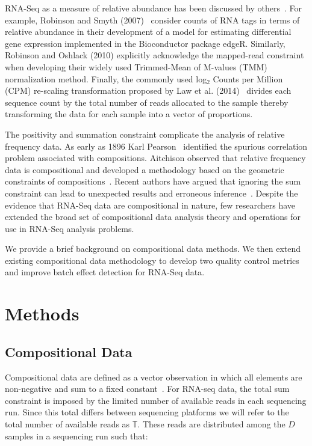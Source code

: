 RNA-Seq as a measure of relative abundance has been discussed by others~\cite{Robinson2007, Anders2010, Robinson2010, Law2014, Lovell2015}.  For example, Robinson and Smyth (2007)~\cite{Robinson2007} consider counts of RNA tags in terms of relative abundance in their development of a model for estimating differential gene expression implemented in the Bioconductor package edgeR.  Similarly, Robinson and Oshlack (2010) explicitly acknowledge the mapped-read constraint when developing their widely used Trimmed-Mean of M-values (TMM) normalization method. Finally, the commonly used log$_2$ Counts per Million (CPM) re-scaling transformation proposed by Law et al. (2014)~\cite{Law2014} divides each sequence count by the total number of reads allocated to the sample thereby transforming the data for each sample into a vector of proportions. %


The positivity and summation constraint complicate the analysis of relative frequency data.  As early as 1896 Karl Pearson~\cite{Pearson1896} identified the spurious correlation problem associated with compositions.  Aitchison observed that relative frequency data is compositional and developed a methodology based on the geometric constraints of compositions~\cite{Aitchison1986}.  Recent authors have argued that ignoring the sum constraint can lead to unexpected results and erroneous inference~\cite{Lovell2011}.  Despite the evidence that RNA-Seq data are compositional in nature, few researchers have extended the broad set of compositional data analysis theory and operations for use in RNA-Seq analysis problems.  

We provide a brief background on compositional data methods.  We then extend existing compositional data methodology to develop two quality control metrics and improve batch effect detection for RNA-Seq data.%

%

\section{Methods}

\subsection{Compositional Data}
Compositional data are defined as a vector observation in which all elements are non-negative and sum to a fixed constant~\cite{Aitchison1986}. %
For RNA-seq data, the total sum constraint is imposed by the limited number of available reads in each sequencing run.  Since this total differs between sequencing platforms we will refer to the total number of available reads as $\mathbb{T}$. These reads are distributed among the $D$ samples in a sequencing run such that:

